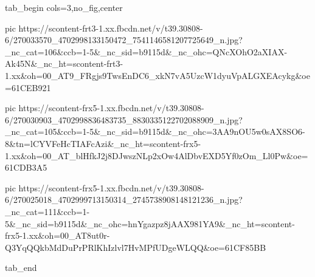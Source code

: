 
 
 
 
 


\ifcmt
  tab_begin cols=3,no_fig,center

     pic https://scontent-frt3-1.xx.fbcdn.net/v/t39.30808-6/270033570_4702998133150472_7541146581207725649_n.jpg?_nc_cat=106&ccb=1-5&_nc_sid=b9115d&_nc_ohc=QNcXOhO2aXIAX-Ak45N&_nc_ht=scontent-frt3-1.xx&oh=00_AT9_FRgjs9TwsEnDC6_xkN7vA5UzcW1dyuVpALGXEAcykg&oe=61CEB921

     pic https://scontent-frx5-1.xx.fbcdn.net/v/t39.30808-6/270030903_4702998836483735_8830335122702088909_n.jpg?_nc_cat=105&ccb=1-5&_nc_sid=b9115d&_nc_ohc=3AA9nOU5w0sAX8SO6-8&tn=lCYVFeHcTIAFcAzi&_nc_ht=scontent-frx5-1.xx&oh=00_AT_blHfkJ2j8DJwszNLp2xOw4AlDbvEXD5Yf0zOm_Ll0Pw&oe=61CDB3A5

     pic https://scontent-frx5-1.xx.fbcdn.net/v/t39.30808-6/270025018_4702999713150314_2745738908148121236_n.jpg?_nc_cat=111&ccb=1-5&_nc_sid=b9115d&_nc_ohc=hnYgazpz8jAAX981YA9&_nc_ht=scontent-frx5-1.xx&oh=00_AT8ut0r-Q3YqQQkbMdDuPrPRlKhIzlvl7HvMPfUDgeWLQQ&oe=61CF85BB

  tab_end
\fi
